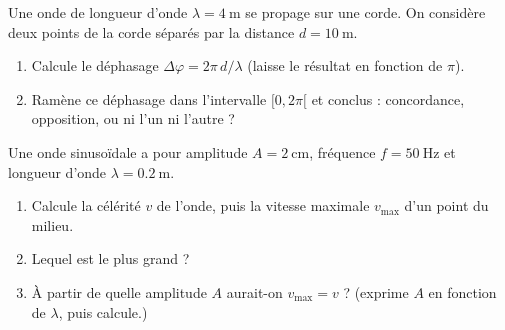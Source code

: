 \documentclass[11pt,a4paper]{article}
\begin{document}
\begin{exo}
Une onde de longueur d'onde $\lambda=\SI{4}{\metre}$ se propage sur une corde. On considère deux
points de la corde séparés par la distance $d=\SI{10}{\metre}$.
\begin{enumerate}[label=\alph*)]
  \item Calcule le déphasage $\Delta\varphi=2\pi\,d/\lambda$ (laisse le résultat en fonction de $\pi$).
  \item Ramène ce déphasage dans l'intervalle $[0,2\pi[$ et conclus : concordance, opposition,
        ou ni l'un ni l'autre ?
\end{enumerate}
\end{exo}

\begin{exo}
Une onde sinusoïdale a pour amplitude $A=\SI{2}{\centi\metre}$, fréquence $f=\SI{50}{\hertz}$ et
longueur d'onde $\lambda=\SI{0.2}{\metre}$.
\begin{enumerate}[label=\alph*)]
  \item Calcule la célérité $v$ de l'onde, puis la vitesse maximale $v_{\max}$ d'un point du milieu.
  \item Lequel est le plus grand ?
  \item À partir de quelle amplitude $A$ aurait-on $v_{\max}=v$ ? (exprime $A$ en fonction de
        $\lambda$, puis calcule.)
\end{enumerate}
\end{exo}
\end{document}
